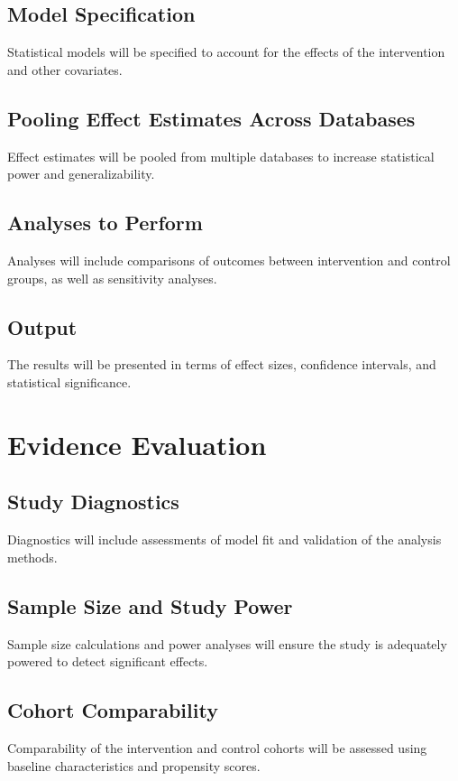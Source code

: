 \documentclass[12pt]{article}
\begin{document}
\subsection{Model Specification}
Statistical models will be specified to account for the effects of the intervention and other covariates.

\subsection{Pooling Effect Estimates Across Databases}
Effect estimates will be pooled from multiple databases to increase statistical power and generalizability.

\subsection{Analyses to Perform}
Analyses will include comparisons of outcomes between intervention and control groups, as well as sensitivity analyses.

\subsection{Output}
The results will be presented in terms of effect sizes, confidence intervals, and statistical significance.

\section{Evidence Evaluation}
\label{evidence-evaluation}

\subsection{Study Diagnostics}
Diagnostics will include assessments of model fit and validation of the analysis methods.

\subsection{Sample Size and Study Power}
Sample size calculations and power analyses will ensure the study is adequately powered to detect significant effects.

\subsection{Cohort Comparability}
Comparability of the intervention and control cohorts will be assessed using baseline characteristics and propensity scores.
\end{document}
